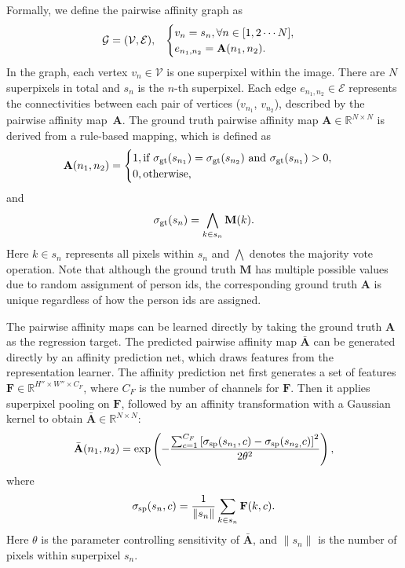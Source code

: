 \documentclass[10pt, letterpaper]{article}
\begin{document}
Formally, we define the pairwise affinity graph as 
\begin{equation}
 \mathcal{G}  =  (\mathcal{V}, \mathcal{E}),  \hspace{3mm}
 \begin{cases}
 v_n = s_n,  \forall n \in [1,2\cdots N], \\
e_{n_1, n_2} = \mathbf{A}(n_1, n_2).
\end{cases}
\end{equation}
In the graph, each vertex $v_n \in \mathcal{V}$  is one superpixel within the image.  There are $N$ superpixels in total and $s_n$ is the $n$-th superpixel. Each edge $e_{n_1, n_2} \in \mathcal{E}$ represents the connectivities between each pair of vertices ($v_{n_1}$, $v_{n_2}$), described by the pairwise affinity map~$\mathbf{A}$. The ground truth pairwise affinity map $\mathbf{A} \in \mathbb{R}^{N \times N}$ is derived from a rule-based mapping, which is defined as 
\begin{equation}\label{eqn:gt_pam}
\mathbf{A}(n_1,n_2)=
\begin{cases}
1,  \text{if }\sigma_{\rm{gt}}(s_{n_1}) = \sigma_{\rm{gt}}(s_{n_2})  \text{ and }  \sigma_{\rm{gt}}(s_{n_1}) >0, \\ 
0,  \text{otherwise}, \\
\end{cases}
\end{equation}
and
\begin{equation}\label{eqn:majority_vote}
\sigma_{\rm{gt}}(s_n)=\bigwedge_{k \in s_{n}} \mathbf{M}(k).
\end{equation}
Here $k \in s_n$ represents all pixels within $s_n$ and $\bigwedge$ denotes the majority vote operation. Note that although the ground truth  $\mathbf{M}$ has multiple possible values due to random assignment of person ids, the corresponding ground truth $\mathbf{A}$ is unique regardless of how the person ids are assigned. 

The pairwise affinity maps can be learned directly by taking the ground truth $\mathbf{A}$ as the regression target.  The predicted pairwise affinity map $\bar{\mathbf{A}}$ can be generated directly by an affinity prediction net, which draws features from the representation learner. The affinity prediction net first generates a set of features ${\mathbf{F}} \in \mathbb{R}^{H'' \times W'' \times C_F}$, where $C_F$ is the number of channels for $\mathbf{F}$. Then it applies superpixel pooling on $\mathbf{F}$, followed by an affinity transformation with a Gaussian kernel to obtain $\bar{\mathbf{A}} \in \mathbb{R}^{N\times N}$:
\begin{equation}\label{eqn:fake_pam}
\bar{\mathbf{A}} (n_1, n_2)= \exp\left(-\frac{\sum_{c=1}^{C_F}\left[\sigma_{\rm{sp}}(s_{n_1},c)-\sigma_{\rm{sp}}(s_{n_2,}c)\right]^2}{2\theta^2} \right),
\end{equation}
where 
\begin{equation}\label{eqn:fake_gam_ave_pooling}
\sigma_{\rm{sp}}(s_n,c)=\frac{1}{\|s_n\|}\sum\limits_{k\in s_n}\mathbf{F}(k,c).
\end{equation}
Here $\theta$ is the parameter controlling sensitivity of $\bar{\mathbf{A}}$, and $\|s_n\|$ is the number of pixels within superpixel $s_n$.
\end{document}
